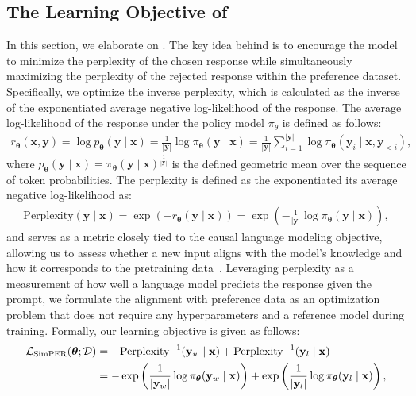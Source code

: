 \subsection{The Learning Objective of \method}

In this section, we elaborate on \method. The key idea behind \method is to encourage the model to minimize the perplexity of the chosen response while simultaneously maximizing the perplexity of the rejected response within the preference dataset. Specifically, we optimize the inverse perplexity, which is calculated as the inverse of the exponentiated average negative log-likelihood of the response. The average log-likelihood of the response under the policy model $\pi_{\theta}$ is defined as follows:
\begin{align}
r_{\boldsymbol{\theta}}(\mathbf{x},\mathbf{y})=\log p_{\boldsymbol{\theta}} (\mathbf{y} \mid \mathbf{x})=\frac{1}{|\mathbf{y}|} \log \pi_{\boldsymbol{\theta}}(\mathbf{y} \mid \mathbf{x})=\frac{1}{|\mathbf{y}|} \sum\nolimits_{i=1}^{|\mathbf{y}|}  \log \pi_{\boldsymbol{\theta}}\left(\mathbf{y}_i \mid \mathbf{x}, \mathbf{y}_{<i}\right), \label{Eq:length}
\end{align}
where $p_{\boldsymbol{\theta}} (\mathbf{y} \mid \mathbf{x})=\pi_{\boldsymbol{\theta}}(\mathbf{y} \mid \mathbf{x})^{\frac{1}{|\mathbf{y}|}}$ is the defined geometric mean over the sequence of token probabilities. The perplexity is defined as the exponentiated its average negative log-likelihood as:
\begin{align}
 \text{Perplexity}(\mathbf{y} \mid \mathbf{x})=\exp \left(-r_{\boldsymbol{\theta}} \left(\mathbf{y} \mid \mathbf{x}\right)\right)=\exp \left(-\frac{1}{|\mathbf{y}|} \log \pi_{\boldsymbol{\theta}}(\mathbf{y} \mid \mathbf{x})\right),
\end{align}
and serves as a metric closely tied to the causal language modeling objective, allowing us to assess whether a new input aligns with the model’s knowledge and how it corresponds to the pretraining data~\citep{jelinek1977perplexity,marion2023less,gonen2023demystifying}. Leveraging perplexity as a measurement of how well a language model predicts the response given the prompt,  we formulate the alignment with preference data as an optimization problem that does not require any hyperparameters and a reference model during training. Formally, our \method learning objective is given as follows:
\begin{align}
    \mathcal{L}_{\rm{SimPER}}(\boldsymbol{\theta}; \mathcal{D})&=- \text{Perplexity}^{-1}(\mathbf{y}_{w} \mid \mathbf{x})+\text{Perplexity}^{-1}(\mathbf{y}_{l} \mid \mathbf{x}) \\
    &=-\exp \left(\frac{1}{|\mathbf{y}_{w}|} \log \pi_{\boldsymbol{\theta}}(\mathbf{y}_{w} \mid \mathbf{x})\right)+\exp \left(\frac{1}{|\mathbf{y}_{l}|} \log \pi_{\boldsymbol{\theta}}(\mathbf{y}_{l} \mid \mathbf{x})\right), \label{Eq:SimPER}
\end{align}
